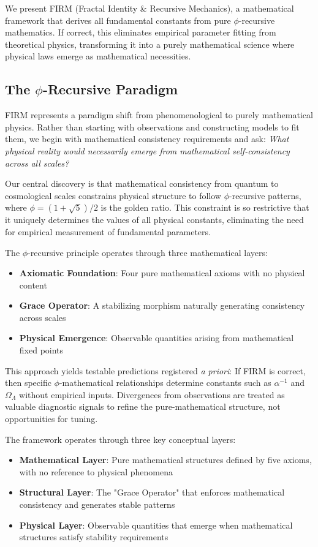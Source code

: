 \documentclass[12pt]{article}
\begin{document}
We present FIRM (Fractal Identity \& Recursive Mechanics), a mathematical framework that derives all fundamental constants from pure $\phi$-recursive mathematics. If correct, this eliminates empirical parameter fitting from theoretical physics, transforming it into a purely mathematical science where physical laws emerge as mathematical necessities.

\subsection{The $\phi$-Recursive Paradigm}

FIRM represents a paradigm shift from phenomenological to purely mathematical physics. Rather than starting with observations and constructing models to fit them, we begin with mathematical consistency requirements and ask: \emph{What physical reality would necessarily emerge from mathematical self-consistency across all scales?}

Our central discovery is that mathematical consistency from quantum to cosmological scales constrains physical structure to follow $\phi$-recursive patterns, where $\phi = (1+\sqrt{5})/2$ is the golden ratio. This constraint is so restrictive that it uniquely determines the values of all physical constants, eliminating the need for empirical measurement of fundamental parameters.

The $\phi$-recursive principle operates through three mathematical layers:
\begin{itemize}
    \item \textbf{Axiomatic Foundation}: Four pure mathematical axioms with no physical content
    \item \textbf{Grace Operator}: A stabilizing morphism naturally generating consistency across scales  
    \item \textbf{Physical Emergence}: Observable quantities arising from mathematical fixed points
\end{itemize}

This approach yields testable predictions registered \emph{a priori}: If FIRM is correct, then specific $\phi$-mathematical relationships determine constants such as $\alpha^{-1}$ and $\Omega_\Lambda$ without empirical inputs. Divergences from observations are treated as valuable diagnostic signals to refine the pure-mathematical structure, not opportunities for tuning.

The framework operates through three key conceptual layers:
\begin{itemize}
    \item \textbf{Mathematical Layer}: Pure mathematical structures defined by five axioms, with no reference to physical phenomena
    \item \textbf{Structural Layer}: The "Grace Operator" that enforces mathematical consistency and generates stable patterns  
    \item \textbf{Physical Layer}: Observable quantities that emerge when mathematical structures satisfy stability requirements
\end{itemize}
\end{document}
